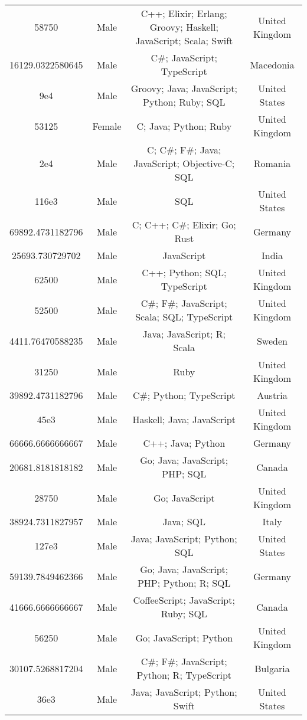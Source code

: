 \begin{center}
\begin{tabular}{ |c|c|c|c| }
58750  &  Male  &  C++; Elixir; Erlang; Groovy; Haskell; JavaScript; Scala; Swift  &  United Kingdom  \\ 
16129.0322580645  &  Male  &  C\#; JavaScript; TypeScript  &  Macedonia  \\ 
9e4  &  Male  &  Groovy; Java; JavaScript; Python; Ruby; SQL  &  United States  \\ 
53125  &  Female  &  C; Java; Python; Ruby  &  United Kingdom  \\ 
2e4  &  Male  &  C; C\#; F\#; Java; JavaScript; Objective-C; SQL  &  Romania  \\ 
116e3  &  Male  &  SQL  &  United States  \\ 
69892.4731182796  &  Male  &  C; C++; C\#; Elixir; Go; Rust  &  Germany  \\ 
25693.730729702  &  Male  &  JavaScript  &  India  \\ 
62500  &  Male  &  C++; Python; SQL; TypeScript  &  United Kingdom  \\ 
52500  &  Male  &  C\#; F\#; JavaScript; Scala; SQL; TypeScript  &  United Kingdom  \\ 
4411.76470588235  &  Male  &  Java; JavaScript; R; Scala  &  Sweden  \\ 
31250  &  Male  &  Ruby  &  United Kingdom  \\ 
39892.4731182796  &  Male  &  C\#; Python; TypeScript  &  Austria  \\ 
45e3  &  Male  &  Haskell; Java; JavaScript  &  United Kingdom  \\ 
66666.6666666667  &  Male  &  C++; Java; Python  &  Germany  \\ 
20681.8181818182  &  Male  &  Go; Java; JavaScript; PHP; SQL  &  Canada  \\ 
28750  &  Male  &  Go; JavaScript  &  United Kingdom  \\ 
38924.7311827957  &  Male  &  Java; SQL  &  Italy  \\ 
127e3  &  Male  &  Java; JavaScript; Python; SQL  &  United States  \\ 
59139.7849462366  &  Male  &  Go; Java; JavaScript; PHP; Python; R; SQL  &  Germany  \\ 
41666.6666666667  &  Male  &  CoffeeScript; JavaScript; Ruby; SQL  &  Canada  \\ 
56250  &  Male  &  Go; JavaScript; Python  &  United Kingdom  \\ 
30107.5268817204  &  Male  &  C\#; F\#; JavaScript; Python; R; TypeScript  &  Bulgaria  \\ 
36e3  &  Male  &  Java; JavaScript; Python; Swift  &  United States  \\ 

\end{tabular}
\end{center}
